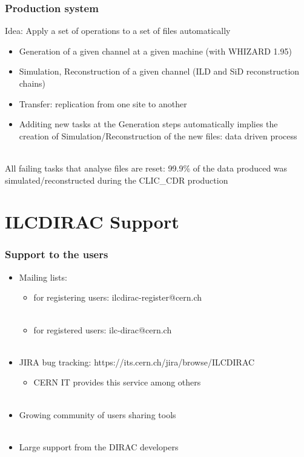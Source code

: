 \documentclass[10pt,table,dvipsnames]{beamer}
\begin{document}
\begin{frame}
  \frametitle{Production system}
Idea: \alert{Apply a set of operations to a set of files automatically}
\begin{itemize}
\item {\color{NavyBlue}Generation} of a given channel at a given machine (with WHIZARD 1.95)
\item {\color{NavyBlue}Simulation, Reconstruction} of a given channel (ILD and SiD
  reconstruction chains)
\item {\color{NavyBlue}Transfer}: replication from one site to another
\item Additing new tasks at the Generation steps automatically implies
  the creation of Simulation/Reconstruction of the new files: \alert{data
  driven process}
\end{itemize}
~\\
All failing tasks that analyse files are reset: \alert{99.9\% of the data
produced was simulated/reconstructed} during the CLIC\_CDR production
\end{frame}

\section{ILCDIRAC Support}
\label{sec:support}

\begin{frame}
  \frametitle{Support to the users}
\begin{itemize}
 \item {\color{NavyBlue}Mailing lists}:
   \begin{itemize}
   \item for registering users: ilcdirac-register@cern.ch\\~\\
   \item for registered users: ilc-dirac@cern.ch\\~\\
   \end{itemize}
 \item {\color{NavyBlue}JIRA bug tracking}: https://its.cern.ch/jira/browse/ILCDIRAC
   \begin{itemize}
   \item CERN IT provides this service among others\\~\\
   \end{itemize}
 \item {\color{NavyBlue}Growing community} of users sharing tools\\~\\
 \item {\color{NavyBlue}Large support} from the DIRAC developers
\end{itemize}
\end{frame}
\end{document}

